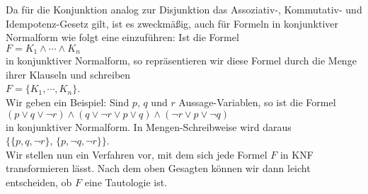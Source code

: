 Da für die Konjunktion analog zur Disjunktion das Assoziativ-, Kommutativ- und Idempotenz-Gesetz
gilt, ist es zweckmäßig, auch für Formeln in konjunktiver Normalform wie folgt eine
 einzuführen:  Ist die Formel
\\[0.2cm]
\hspace*{1.3cm}
$F = K_1 \wedge \cdots \wedge K_n$
\\[0.2cm]
in konjunktiver Normalform, so repräsentieren wir diese
Formel  durch die Menge ihrer Klauseln und schreiben \\[0.2cm]
\hspace*{1.3cm} 
$F = \{ K_1, \cdots, K_n \}$. 
\\[0.2cm]
Wir geben ein Beispiel:  Sind $p$, $q$ und $r$ Aussage-Variablen, so ist die Formel
\\[0.2cm]
\hspace*{1.3cm}
$(p \vee q \vee \neg r) \wedge (q \vee \neg r \vee p \vee q)\wedge (\neg r \vee p \vee \neg q)$
\\[0.2cm]
in konjunktiver Normalform.  In Mengen-Schreibweise wird daraus
\\[0.2cm]
\hspace*{1.3cm}
$\bigl\{ \{p, q, \neg r \},\, \{ p, \neg q, \neg r \} \bigr\}$.
\\[0.2cm]
Wir stellen nun ein Verfahren vor, mit dem sich jede Formel $F$ in KNF transformieren lässt.  Nach
dem oben Gesagten können wir dann leicht entscheiden, ob $F$ eine Tautologie ist.

